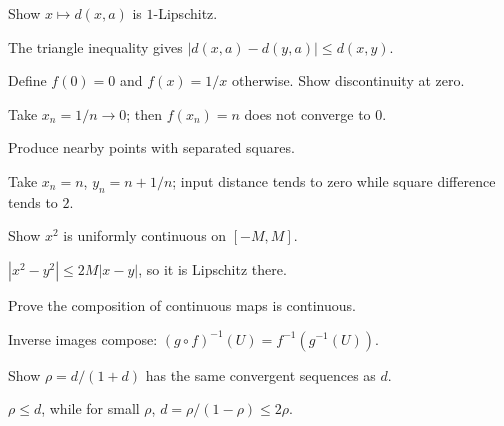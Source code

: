 \begin{problem}\label{prob:ii05-problem-03}
Show $x\mapsto d(x,a)$ is $1$-Lipschitz.
\end{problem}
\begin{solution}
The triangle inequality gives $|d(x,a)-d(y,a)|\le d(x,y)$.
\end{solution}

\begin{problem}\label{prob:ii05-problem-04}
Define $f(0)=0$ and $f(x)=1/x$ otherwise. Show discontinuity at zero.
\end{problem}
\begin{solution}
Take $x_n=1/n\to0$; then $f(x_n)=n$ does not converge to $0$.
\end{solution}

\begin{problem}\label{prob:ii05-problem-05}
Produce nearby points with separated squares.
\end{problem}
\begin{solution}
Take $x_n=n$, $y_n=n+1/n$; input distance tends to zero while square difference tends to $2$.
\end{solution}

\begin{problem}\label{prob:ii05-problem-06}
Show $x^2$ is uniformly continuous on $[-M,M]$.
\end{problem}
\begin{solution}
$|x^2-y^2|\le2M|x-y|$, so it is Lipschitz there.
\end{solution}

\begin{problem}[Composition]\label{prob:ii05-problem-07}
Prove the composition of continuous maps is continuous.
\end{problem}
\begin{solution}
Inverse images compose: $(g\circ f)^{-1}(U)=f^{-1}(g^{-1}(U))$.
\end{solution}

\begin{problem}\label{prob:ii05-problem-08}
Show $\rho=d/(1+d)$ has the same convergent sequences as $d$.
\end{problem}
\begin{solution}
$\rho\le d$, while for small $\rho$, $d=\rho/(1-\rho)\le2\rho$.
\end{solution}

